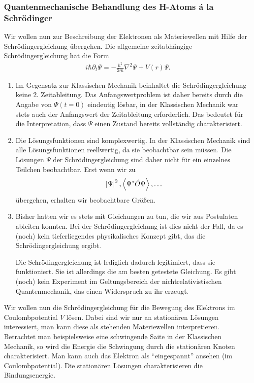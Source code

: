 \subsubsection{Quantenmechanische Behandlung des H-Atoms á la Schrödinger}

Wir wollen nun zur Beschreibung der Elektronen als Materiewellen
mit Hilfe der Schrödingergleichung übergehen. Die allgemeine
zeitabhängige Schrödingergleichung hat die Form
\begin{align*}
i\hbar \partial_t \Psi = -\frac{\hbar^2}{2m}\nabla^2\Psi + V(r)\Psi.
\end{align*}
\begin{bemn}[Bemerkungen.]
\begin{enumerate}[label=\arabic{*}.)]
  \item Im Gegensatz zur Klassischen Mechanik beinhaltet die
  Schrödingergleichung keine 2. Zeitableitung. Das Anfangswertproblem ist daher
  bereits durch die Angabe von $\Psi(t=0)$ eindeutig lösbar, in der
  Klassischen Mechanik war stets auch der Anfangswert der Zeitableitung
  erforderlich. Das bedeutet für die Interpretation, dass $\Psi$ einen Zustand
  bereits vollständig charakterisiert.
  \item Die Lösungsfunktionen sind komplexwertig. In der Klassischen Mechanik
  sind alle Lösungsfunktionen reellwertig, da sie beobachtbar sein müssen. Die
  Lösungen $\Psi$ der Schrödingergleichung sind daher nicht für ein einzelnes
  Teilchen beobachtbar. Erst wenn wir zu 
\begin{align*}
\left|\Psi\right|^2, \left\langle\Psi^*\hat{\boldmath{O}}\Psi\right\rangle, \ldots
\end{align*}
übergehen, erhalten wir beobachtbare Größen.
\item
Bisher hatten wir es stets mit Gleichungen zu tun, die wir aus Postulaten
ableiten konnten. Bei der Schrödingergleichung ist dies nicht der Fall,
da es (noch) kein tieferliegendes physikalisches Konzept gibt, das die
Schrödingergleichung ergibt.

Die Schrödingergleichung ist lediglich dadurch legitimiert, dass sie
funktioniert. Sie ist allerdings die am besten getestete Gleichung. Es gibt
(noch) kein Experiment im Geltungsbereich der nichtrelativistischen Quantenmechanik, das
einen Widerspruch zu ihr erzeugt. \maphere
\end{enumerate}
\end{bemn}


Wir wollen nun die Schrödingergleichung für die Bewegung des Elektrons im
Coulombpotential $V$ lösen. Dabei sind wir nur an stationären Lösungen
interessiert, man kann diese als stehenden Materiewellen interpretieren. Betrachtet man
beispielsweise eine schwingende Saite in der Klassischen Mechanik, so wird
die Energie die Schwingung durch die stationären Knoten charakterisiert.
Man kann auch das Elektron als ``eingespannt'' ansehen (im Coulombpotential).
Die stationären Lösungen charakterisieren die Bindungsenergie.

